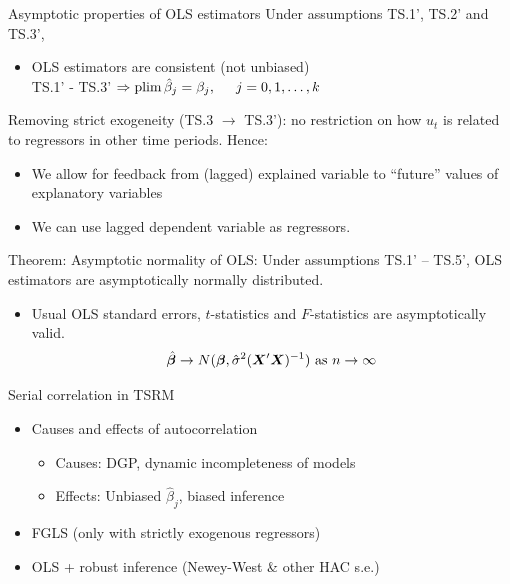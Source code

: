 \documentclass{beamer}
\begin{document}
\begin{frame}{Asymptotic properties of OLS estimators}
Under assumptions TS.1', TS.2' and TS.3', \\ \medskip
\begin{itemize}
\item OLS estimators are consistent (not unbiased)\\ 
\medskip
TS.1' - TS.3' $\Rightarrow \textnormal{plim}\,\hat{\beta}_j = \beta_j, \hspace{0.5cm} j=0, 1, \dots, k$
\end{itemize} \bigskip
Removing strict exogeneity (TS.3 $\rightarrow$ TS.3'): no restriction on how $u_t$ is related to regressors in other time periods. Hence: \\
\medskip
\begin{itemize}
\item We allow for feedback from (lagged) explained variable to ``future'' values of explanatory variables 
\medskip
\item We can use lagged dependent variable as regressors.
\end{itemize} \medskip
Theorem: Asymptotic normality of OLS: Under assumptions TS.1' – TS.5', OLS estimators are asymptotically normally distributed. \medskip
\begin{itemize}
\item Usual OLS standard errors, $t$-statistics and $F$-statistics are asymptotically valid.
$$
\hat{\bm{\beta}} \rightarrow N(\bm{\beta}, \hat{\sigma}^2(\bm{X}^{\prime} \bm{X})^{-1} )
\textnormal{~as~} n \rightarrow \infty
$$
\end{itemize}
\end{frame}
\begin{frame}{Serial correlation in TSRM}
\begin{itemize}
\item Causes and effects of autocorrelation \\ \bigskip 
 \begin{itemize}
     \item Causes:  DGP, dynamic incompleteness of models
     \bigskip
     \item Effects: Unbiased $\hat{\beta}_j$, biased inference
 \end{itemize}
\bigskip
\item FGLS (only with strictly exogenous regressors)
\bigskip
\item OLS + robust inference (Newey-West \& other HAC s.e.)
\end{itemize}
\end{frame}
\end{document}
